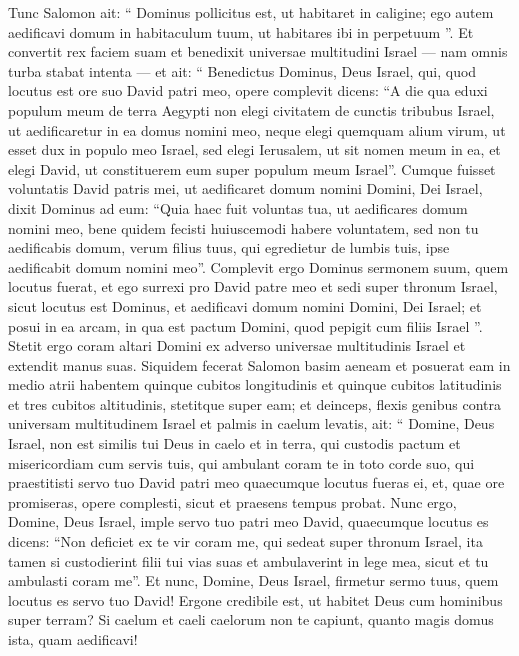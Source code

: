 \begin{biblechapter}
\begin{biblechapter}
\begin{biblechapter}
\begin{biblechapter}
\begin{biblechapter}
\begin{biblechapter}
\verse Tunc Salomon ait: “ Dominus pollicitus est, ut habitaret in caligine; 
\verse ego autem aedificavi domum in habitaculum tuum, ut habitares ibi in perpetuum ”.
 \verse Et convertit rex faciem suam et benedixit universae multitudini Israel — nam omnis turba stabat intenta — et ait: 
\verse “ Benedictus Dominus, Deus Israel, qui, quod locutus est ore suo David patri meo, opere complevit dicens: 
\verse “A die qua eduxi populum meum de terra Aegypti non elegi civitatem de cunctis tribubus Israel, ut aedificaretur in ea domus nomini meo, neque elegi quemquam alium virum, ut esset dux in populo meo Israel, 
\verse sed elegi Ierusalem, ut sit nomen meum in ea, et elegi David, ut constituerem eum super populum meum Israel”. 
\verse Cumque fuisset voluntatis David patris mei, ut aedificaret domum nomini Domini, Dei Israel, 
\verse dixit Dominus ad eum: “Quia haec fuit voluntas tua, ut aedificares domum nomini meo, bene quidem fecisti huiuscemodi habere voluntatem, 
\verse sed non tu aedificabis domum, verum filius tuus, qui egredietur de lumbis tuis, ipse aedificabit domum nomini meo”. 
\verse Complevit ergo Dominus sermonem suum, quem locutus fuerat, et ego surrexi pro David patre meo et sedi super thronum Israel, sicut locutus est Dominus, et aedificavi domum nomini Domini, Dei Israel; 
\verse et posui in ea arcam, in qua est pactum Domini, quod pepigit cum filiis Israel ”.
 \verse Stetit ergo coram altari Domini ex adverso universae multitudinis Israel et extendit manus suas. 
\verse Siquidem fecerat Salomon basim aeneam et posuerat eam in medio atrii habentem quinque cubitos longitudinis et quinque cubitos latitudinis et tres cubitos altitudinis, stetitque super eam; et deinceps, flexis genibus contra universam multitudinem Israel et palmis in caelum levatis, 
 \verse ait: “ Domine, Deus Israel, non est similis tui Deus in caelo et in terra, qui custodis pactum et misericordiam cum servis tuis, qui ambulant coram te in toto corde suo, 
\verse qui praestitisti servo tuo David patri meo quaecumque locutus fueras ei, et, quae ore promiseras, opere complesti, sicut et praesens tempus probat. 
\verse Nunc ergo, Domine, Deus Israel, imple servo tuo patri meo David, quaecumque locutus es dicens: “Non deficiet ex te vir coram me, qui sedeat super thronum Israel, ita tamen si custodierint filii tui vias suas et ambulaverint in lege mea, sicut et tu ambulasti coram me”. 
\verse Et nunc, Domine, Deus Israel, firmetur sermo tuus, quem locutus es servo tuo David!
 \verse Ergone credibile est, ut habitet Deus cum hominibus super terram? Si caelum et caeli caelorum non te capiunt, quanto magis domus ista, quam aedificavi! 

\end{biblechapter}
\end{biblechapter}
\end{biblechapter}
\end{biblechapter}
\end{biblechapter}
\end{biblechapter}
